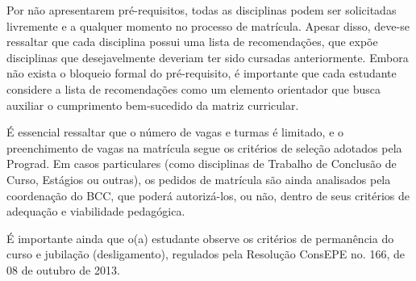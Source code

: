 Por não apresentarem pré-requisitos, todas as disciplinas podem ser solicitadas livremente e a qualquer momento no processo de matrícula. Apesar disso, deve-se ressaltar que cada disciplina possui uma lista de recomendações, que expõe disciplinas que desejavelmente deveriam ter sido cursadas anteriormente. Embora não exista o bloqueio formal do pré-requisito, é importante que cada estudante considere a lista de recomendações como um elemento orientador que busca auxiliar o cumprimento bem-sucedido da matriz curricular.

É essencial ressaltar que o número de vagas e turmas é limitado, e o preenchimento de vagas na matrícula segue os critérios de seleção adotados pela Prograd. Em casos particulares (como disciplinas de Trabalho de Conclusão de Curso, Estágios ou outras), os pedidos de matrícula são ainda analisados pela coordenação do BCC, que poderá autorizá-los, ou não, dentro de seus critérios de adequação e viabilidade pedagógica.

É importante ainda que o(a) estudante observe os critérios de permanência do curso e jubilação (desligamento), regulados pela Resolução ConsEPE no. 166, de 08 de outubro de 2013.
